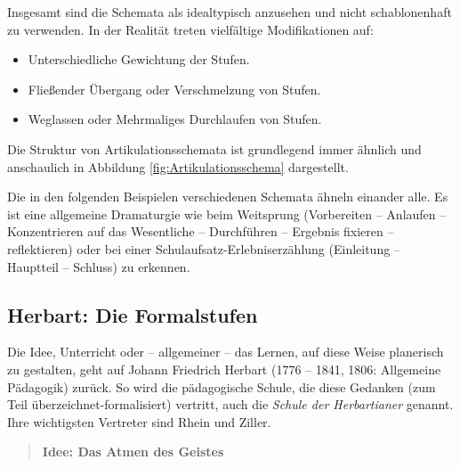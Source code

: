 \mip
Insgesamt sind die Schemata als idealtypisch anzusehen und
nicht schablonenhaft zu verwenden.
In der Realit\"{a}t treten vielf\"{a}ltige Modifikationen auf:
\begin{itemize}
	\item
	Unterschiedliche Gewichtung der Stufen.
	\item
	Flie{\ss}ender \"{U}bergang oder Verschmelzung von Stufen.
	\item
	Weglassen oder Mehrmaliges Durchlaufen von Stufen.
\end{itemize}


Die Struktur von Artikulationsschemata ist grundlegend immer \"{a}hnlich und anschaulich in Abbildung \ref{fig:Artikulationsschema} dargestellt.

\mip
Die in den folgenden Beispielen verschiedenen Schemata \"{a}hneln
einander alle. Es ist eine allgemeine Dramaturgie
wie beim Weitsprung (Vorbereiten -- Anlaufen -- Konzentrieren
auf das Wesentliche -- Durchf\"{u}hren -- Ergebnis fixieren --
reflektieren) oder bei einer
Schulaufsatz-Erlebniserz\"{a}hlung (Einleitung -- Hauptteil -- Schluss) zu erkennen.

\subsection{Herbart: Die Formalstufen}
Die Idee, Unterricht oder -- allgemeiner -- das Lernen, auf diese
Weise planerisch zu gestalten, geht auf Johann Friedrich
Herbart (1776 -- 1841, 1806: Allgemeine P\"{a}dagogik) zur\"{u}ck.
So wird die p\"{a}dagogische Schule, die diese Gedanken (zum Teil
\"{u}berzeichnet-formalisiert) vertritt,
auch die {\em Schule der Herbartianer} genannt.
Ihre wichtigsten Vertreter sind Rhein und Ziller.

\begin{quote}
	\bf Idee: Das Atmen des Geistes
\end{quote}

